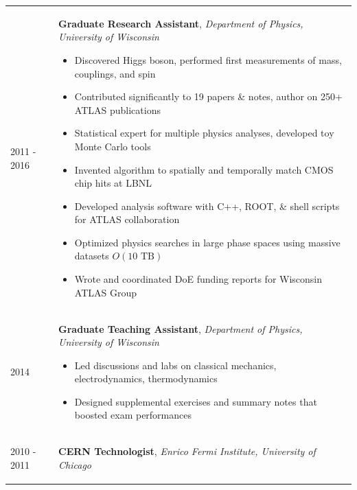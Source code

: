 \documentclass{letter}
\begin{document}
\begin{tabular}{p{}p{}}
	2011 - 2016
	&
	\textbf{Graduate Research Assistant}, \textit{Department of Physics, University of Wisconsin} \newline
	\vspace{-15pt}      %
	\begin{itemize}
		\itemsep0em
		\renewcommand{\labelitemi}{\tiny$\blacksquare$}
    		\item Discovered Higgs boson, performed first measurements of mass, couplings, and spin 
		\item Contributed significantly to 19 papers \& notes, author on 250+ ATLAS publications
    		\item Statistical expert for multiple physics analyses, developed toy Monte Carlo tools
		\item Invented algorithm to spatially and temporally match CMOS chip hits at LBNL 
    		\item Developed analysis software with C++, ROOT, \& shell scripts for ATLAS collaboration
		\item Optimized physics searches in large phase spaces using massive datasets $O(10 \textrm{ TB})$ 
		\item Wrote and coordinated DoE funding reports for Wisconsin ATLAS Group
	\end{itemize}
\\
	2014 
	& 
	\textbf{Graduate Teaching Assistant}, \textit{Department of Physics, University of Wisconsin} \newline
	\vspace{-15pt}      %
	\begin{itemize}
		\itemsep0em
		\renewcommand{\labelitemi}{\tiny$\blacksquare$} 
		\item Led discussions and labs on classical mechanics, electrodynamics, thermodynamics
    		\item Designed supplemental exercises and summary notes that boosted exam performances
	\end{itemize}
\\
	2010 - 2011
	&
	\textbf{CERN Technologist}, \textit{Enrico Fermi Institute, University of Chicago} \newline
	\vspace{-15pt}      %
	\begin{itemize}

\end{itemize}
\end{tabular}
\end{document}

